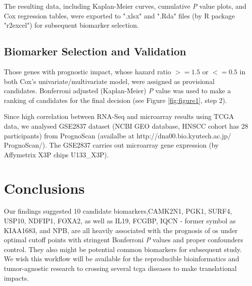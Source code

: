 \documentclass[jpm,article,submit,moreauthors,pdftex]{Definitions/mdpi}
\begin{document}
\begin{paracol}{2}
The resulting data, including Kaplan-Meier curves, cumulative \textit{P} value plots, and Cox regression tables, were exported to ".xlsx" and ".Rda" files (by R package "r2excel") for subsequent biomarker selection.


\subsection{Biomarker Selection and Validation}

Those genes with prognostic impact, whose hazard ratio $>=1.5$ or $<=0.5$ in both Cox's univariate/multivariate model, were assigned as provisional candidates.
Bonferroni adjusted (Kaplan-Meier) \textit{P} value was used to make a ranking of candidates for the final decision (see Figure \ref{fig:figure1}, step 2).

Since high correlation between RNA-Seq and microarray results using TCGA data\cite{Guo2013}\cite{Chen2017c},
we analysed GSE2837 dataset (NCBI GEO database\cite{Chung2006}, HNSCC cohort has 28 participants) from PrognoScan (availalbe at http://dna00.bio.kyutech.ac.jp/\\PrognoScan/)\cite{Mizuno2009a}.
The GSE2837 carries out %
microarray gene expression (by Affymetrix X3P chips U133\_X3P).

\section{Conclusions} %
Our findings suggested 10 candidate biomarkers,CAMK2N1, PGK1, SURF4, USP10, NDFIP1, FOXA2, as well as IL19, FCGBP, IQCN - former symbol as KIAA1683, and NPB, are all heavily associated with the prognosis of \acrshort{os} under optimal cutoff points with stringent Bonferroni \textit{P} values and proper confounders control. They also might be potential common biomarkers for subsequent study.
We wish this workflow will be available for the reproducible bioinformatics\cite{Preeyanon2014}\cite{Kulkarni2018} and tumor-agnostic research\cite{Looney2020} to crossing several \acrshort{tcga} diseases to make translational impacts. %


\end{paracol}
\end{document}
